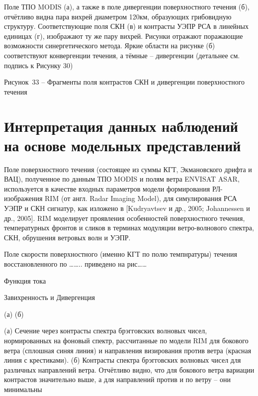 Поле ТПО MODIS (а), а также в поле дивергенции поверхностного течения (б), отчётливо видна пара вихрей диаметром 120км, образующих грибовидную структуру. Соответствующие поля СКН (в) и контрасты УЭПР РСА в линейных единицах (г), изображают ту же пару вихрей. Рисунки отражают поражающие возможности синергетического метода. Яркие области на рисунке (б) соответствуют конвергенции течения, а тёмные -- дивергенции (детальнее см. подпись к Рисунку 30)



Рисунок~33 -- Фрагменты поля контрастов СКН и дивергенции поверхностного течения



\section{Интерпретация данных наблюдений на основе модельных представлений} \label{sec:3.3}


Поле поверхностного течения (состоящее из суммы КГТ, Экмановского дрифта и ВАЦ), полученное по данным ТПО MODIS и полям ветра ENVISAT ASAR, используется в качестве входных параметров модели формирования РЛ-изображения RIM (от англ. Radar Imaging Model), для симулирования РСА УЭПР и СКН сигнатур, как изложено в [Kudryavtsev и др., 2005; Johannessen и др., 2005]. RIM моделирует проявления особенностей поверхностного течения, температурных фронтов и сликов в терминах модуляции ветро-волнового спектра, СКН, обрушения ветровых волн и УЭПР. 

Поле скорости поверхностного (именно КГТ по полю темпнратуры) течения восстановленного по \dots \dots .. приведено на рис\dots \dots 

Функция тока

Завихренность и Дивергенция



\label{ZEqnNum858310}\label{1.12)}\label{ZEqnNum180077}\label{ZEqnNum393333}\label{ZEqnNum183606}\label{ZEqnNum816544}  \label{ZEqnNum404518}\label{1.18)}\label{ZEqnNum567066}\label{1.20)}\label{ZEqnNum735720}\label{1.22)}



(а)       (б)



(а) Сечение через контрасты спектра брэгговских волновых чисел, нормированных на фоновый спектр, рассчитанные по модели RIM для бокового ветра (сплошная синяя линия) и направления визирования против ветра (красная линия с крестиками). (б) Контрасты спектра брэгговских волновых чисел для различных направлений ветра. Отчётливо видно, что для бокового ветра вариации контрастов значительно выше, а для направлений против и по ветру -- они минимальны



